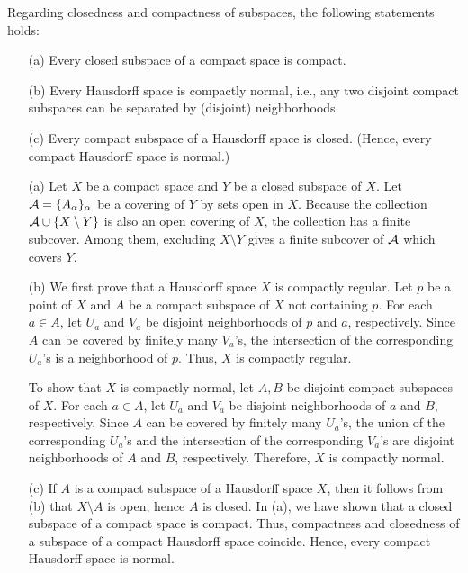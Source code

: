 \begin{thm}
    Regarding closedness and compactness of subspaces, the following statements holds:
    \begin{enumerate}
        \item[(a)] Every closed subspace of a compact space is compact.
        \item[(b)] Every Hausdorff space is compactly normal, i.e., any two disjoint compact subspaces can be separated by (disjoint) neighborhoods.
        \item[(c)] Every compact subspace of a Hausdorff space is closed. (Hence, every compact Hausdorff space is normal.)
    \end{enumerate}
\end{thm}
\begin{sol}
    \begin{enumerate}
        \item[(a)]
            Let $X$ be a compact space and $Y$ be a closed subspace of $X$.
            Let ${\mathcal{A}}=\{A_\alpha\}_\alpha$ be a covering of $Y$ by sets open in $X$.
            Because the collection ${\mathcal{A}}\cup\{X\setminus Y\}$ is also an open covering of $X$, the collection has a finite subcover.
            Among them, excluding $X\setminus Y$ gives a finite subcover of ${\mathcal{A}}$ which covers $Y$.
        \item[(b)]
            We first prove that a Hausdorff space $X$ is compactly regular.
            Let $p$ be a point of $X$ and $A$ be a compact subspace of $X$ not containing $p$.
            For each $a\in A$, let $U_a$ and $V_a$ be disjoint neighborhoods of $p$ and $a$, respectively.
            Since $A$ can be covered by finitely many $V_a$'s, the intersection of the corresponding $U_a$'s is a neighborhood of $p$.
            Thus, $X$ is compactly regular.

            To show that $X$ is compactly normal, let $A, B$ be disjoint compact subspaces of $X$.
            For each $a\in A$, let $U_a$ and $V_a$ be disjoint neighborhoods of $a$ and $B$, respectively.
            Since $A$ can be covered by finitely many $U_a$'s, the union of the corresponding $U_a$'s and the intersection of the corresponding $V_a$'s are disjoint neighborhoods of $A$ and $B$, respectively.
            Therefore, $X$ is compactly normal.
        \item[(c)]
            If $A$ is a compact subspace of a Hausdorff space $X$, then it follows from (b) that $X\setminus A$ is open, hence $A$ is closed.
            In (a), we have shown that a closed subspace of a compact space is compact.
            Thus, compactness and closedness of a subspace of a compact Hausdorff space coincide.
            Hence, every compact Hausdorff space is normal.
    \end{enumerate}
\end{sol}

